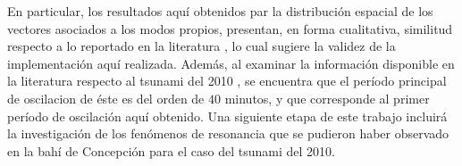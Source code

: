   En particular, los resultados aqu\'i obtenidos par la distribuci\'on espacial de los vectores asociados a los modos propios, presentan, en forma cualitativa, similitud respecto a lo reportado en la literatura \cite{Belloti2012}, lo cual sugiere la validez de la implementaci\'on aqu\'i realizada. Adem\'as, al examinar la informaci\'on disponible en la literatura respecto al tsunami del 2010 \cite{Yamazaki2011}, se encuentra que el per\'iodo principal de oscilacion de \'este es del orden de $40$ minutos, y que corresponde al primer per\'iodo de oscilaci\'on aqu\'i obtenido. Una siguiente etapa de este trabajo incluir\'a la investigaci\'on de los fen\'omenos de resonancia que se pudieron haber observado en la bah\'i de Concepci\'on para el caso del tsunami del 2010.
  
  